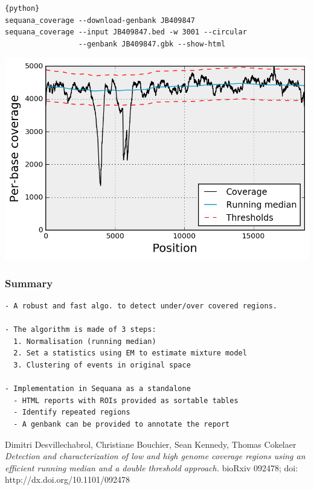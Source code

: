 \documentclass{beamer}
\begin{document}
\begin{frame}[fragile]
\begin{lstlisting}{python}
sequana_coverage --download-genbank JB409847
sequana_coverage --input JB409847.bed -w 3001 --circular 
                 --genbank JB409847.gbk --show-html
\end{lstlisting}
\includegraphics[height=0.7\textheight, 
    width=1\textwidth]{images/virus.png}
\end{frame}


\begin{frame}[fragile]
 \frametitle{Summary}
\begin{verbatim}
- A robust and fast algo. to detect under/over covered regions.

- The algorithm is made of 3 steps:
  1. Normalisation (running median)
  2. Set a statistics using EM to estimate mixture model
  3. Clustering of events in original space

- Implementation in Sequana as a standalone 
  - HTML reports with ROIs provided as sortable tables
  - Identify repeated regions
  - A genbank can be provided to annotate the report
\end{verbatim}    

 \footnotesize{
Dimitri Desvillechabrol, Christiane Bouchier, Sean Kennedy, Thomas Cokelaer
\textit{Detection and characterization of low and high genome coverage 
regions using an efficient running median and a double threshold approach.}
bioRxiv 092478; doi: http://dx.doi.org/10.1101/092478
}

\end{frame}
\end{document}
